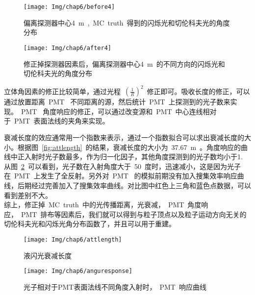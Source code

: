 \begin{figure}[!htbp]
\begin{minipage}[t]{0.49\linewidth}
  \centering
   \texttt{[image: Img/chap6/before4]}
    \caption{偏离探测器中心4~m~,~MC~truth~得到的闪烁光和切伦科夫光的角度分布}
  \label{fig:before4}
\end{minipage}
\quad\quad
\begin{minipage}[t]{0.49\linewidth}
  \centering
   \texttt{[image: Img/chap6/after4]}
    \caption{修正掉探测器因素后，偏离探测器中心4~m~的不同方向的闪烁光和切伦科夫光的角度分布}
  \label{fig:after4}
  \end{minipage}
\end{figure}
立体角因素的修正比较简单，通过光程~$\left ( \frac{1}{R} \right )^2 $~修正即可。吸收长度的修正，可以通过放置距离~PMT~ 不同距离的源，然后统计~PMT~上探测到的光子数来实现。~PMT~ 角度响应的修正，可以通过改变源和~PMT~中心连线相对于~PMT~表面法线的夹角来实现。

衰减长度的效应通常用一个指数来表示，通过一个指数拟合可以求出衰减长度的大小。根据图~\ref{fig:attlength}~的结果，衰减长度的大小为~37.67~m~。角度响应的曲线中正入射时光子数最多，作为归一化因子，其他角度探测到的光子数均小于1. 从图~\ref{fig:anguresponse}~可以看到，光子数在入射角度大于~50~度时，迅速减小，这是因为光子在~PMT~上发生了全反射。另外对~PMT~ 的模拟前期没有加入搜集效率响应曲线，后期经过完善加入了搜集效率曲线。对比图中红色上三角和蓝色点数据，可以看到差别不大。\\

综上，修正掉~MC~truth~中的光传播距离，光衰减，~PMT~角度响应，~PMT~排布等因素后，我们就可以得到与粒子顶点以及粒子运动方向无关的切伦科夫光和闪烁光角分布函数了，并且可以用于重建。
\begin{figure}[!htbp]
\begin{minipage}[t]{0.48\linewidth}
  \centering
   \texttt{[image: Img/chap6/attlength]}
    \caption{液闪光衰减长度}
  \label{fig:attlength}
  \end{minipage}
  \quad\quad
\begin{minipage}[t]{0.48\linewidth}
  \centering
   \texttt{[image: Img/chap6/anguresponse]}
    \caption{光子相对于PMT表面法线不同角度入射时，~PMT~响应曲线}
  \label{fig:anguresponse}
\end{minipage}
\end{figure}

